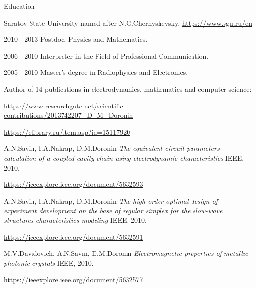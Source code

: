 \documentclass{resume}
\begin{document}

\begin{rSection}{Education}

\begin{rSubsection}{Saratov State University named after N.G.Chernyshevsky, \url{https://www.sgu.ru/en}}{}{}{}

      2010 | 2013 Postdoc, Physics and Mathematics.

      2006 | 2010 Interpreter in the Field of Professional Communication.

      2005 | 2010 Master's degree in Radiophysics and Electronics.


      Author of 14 publications in electrodynamics, mathematics and computer science:
      \item[] \url{https://www.researchgate.net/scientific-contributions/2013742207_D_M_Doronin}
      \item[] \url{https://elibrary.ru/item.asp?id=15117920}

\begin{thebibliography}{}
    A.N.Savin, I.A.Nakrap, D.M.Doronin
    \textit{The equivalent circuit parameters calculation of a coupled cavity chain using electrodynamic characteristics}
    IEEE, 2010.

    \url{https://ieeexplore.ieee.org/document/5632593}

    A.N.Savin, I.A.Nakrap, D.M.Doronin
    \textit{The high-order optimal design of experiment development on the base of regular simplex for the slow-wave structures characteristics modeling}
    IEEE, 2010.

    \url{https://ieeexplore.ieee.org/document/5632591}


    M.V.Davidovich, A.N.Savin, D.M.Doronin
    \textit{Electromagnetic properties of metallic photonic crystals}
    IEEE, 2010.

    \url{https://ieeexplore.ieee.org/document/5632577}
\end{thebibliography}

\end{rSubsection}
\end{rSection}
\end{document}
